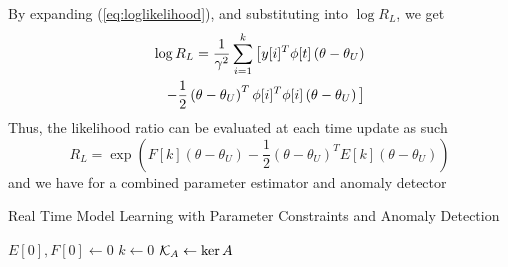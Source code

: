 By expanding (\ref{eq:loglikelihood}), and substituting into $\log R_L$, we get
\begin{equation}
    \begin{aligned}
        \log R_L = \frac{1}{\gamma^2}\sum\limits_{i=1}^{k} \big{[}
        y[i]^T\phi[t]\left(\theta - \theta_U\right)\\
        -\frac{1}{2}\left(\theta - \theta_U\right)^T
        \phi[i]^T\phi[i]\left(\theta - \theta_U\right)\big{]}
    \end{aligned}
\end{equation}
Thus, the likelihood ratio can be evaluated at each time update as such
\begin{equation}
    R_L = \exp\left( F[k]\left(\theta - \theta_U\right) - 
    \frac{1}{2}\left(\theta - \theta_U\right)^TE[k]\left(\theta - \theta_U\right)  \right)
    \label{eq:likelihoodratio}
\end{equation}
and we have for a combined parameter estimator and anomaly detector
\begin{algorithm}
    \caption{Real Time Model Learning with Parameter Constraints and Anomaly Detection}
    \label{alg:anomalydetector}
    $E[0], F[0] \gets 0$\;
    $k \gets 0$\;
    $\mathcal{K}_A \gets \ker A$\;
\end{algorithm}